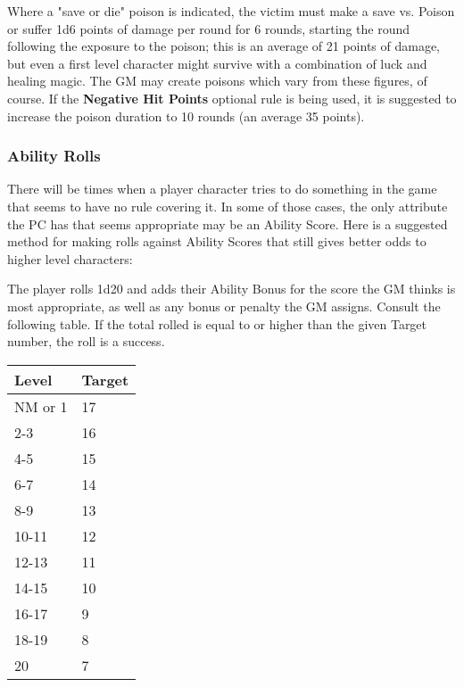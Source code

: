 \documentclass[a4paper,twoside,openany,10pt]{book}
\begin{document}
\begin{multicols}{2}
Where a "save or die" poison is indicated, the victim must make a save vs. Poison or suffer 1d6 points of damage per round for 6 rounds, starting the round following the exposure to the poison; this is an average of 21 points of damage, but even a first level character might survive with a combination of luck and healing magic. The GM may create poisons which vary from these figures, of course. If the \textbf{Negative Hit Points} optional rule is being used, it is suggested to increase the poison duration to 10 rounds (an average 35 points).

\subsubsection{Ability Rolls}\label{ability-rolls}

There will be times when a player character tries to do something in the game that seems to have no rule covering it. In some of those cases, the only attribute the PC has that seems appropriate may be an Ability Score. Here is a suggested method for making rolls against Ability Scores that still gives better odds to higher level characters:

The player rolls 1d20 and adds their Ability Bonus for the score the GM thinks is most appropriate, as well as any bonus or penalty the GM assigns. Consult the following table. If the total rolled is equal to or higher than the given Target number, the roll is a success.


\begin{flushleft}
	\begin{tabular*}{0.93\linewidth}{@{\extracolsep{\fill}}ll}
\textbf{Level} & \textbf{Target} \\\toprule
NM or 1 & 17 \\\hline
2-3 & 16 \\\hline
4-5 & 15 \\\hline
6-7 & 14 \\\hline
8-9 & 13 \\\hline
10-11 & 12 \\\hline
12-13 & 11 \\\hline
14-15 & 10 \\\hline
16-17 & 9 \\\hline
18-19 & 8 \\\hline
20 & 7 \\\bottomrule
\end{tabular*}
\end{flushleft}


\end{multicols}
\end{document}
